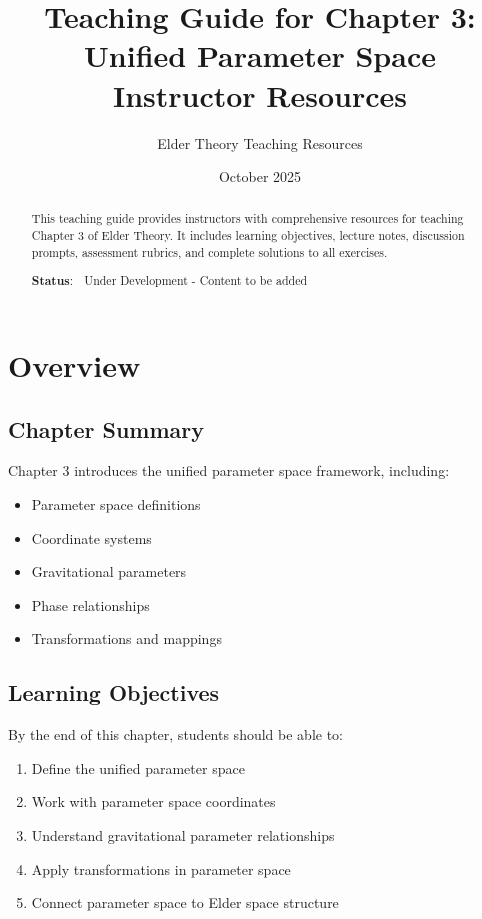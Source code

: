 \documentclass[12pt,a4paper]{article}
\title{\textbf{Teaching Guide for Chapter 3:}\\
\Large{Unified Parameter Space}\\
\large{Instructor Resources}}
\author{Elder Theory Teaching Resources}
\date{October 2025}
\begin{document}
\maketitle

\begin{abstract}
This teaching guide provides instructors with comprehensive resources for teaching Chapter 3 of Elder Theory. It includes learning objectives, lecture notes, discussion prompts, assessment rubrics, and complete solutions to all exercises.

\textbf{Status}: 🚧 Under Development - Content to be added
\end{abstract}

\tableofcontents
\newpage

\section{Overview}

\subsection{Chapter Summary}
Chapter 3 introduces the unified parameter space framework, including:
\begin{itemize}
    \item Parameter space definitions
    \item Coordinate systems
    \item Gravitational parameters
    \item Phase relationships
    \item Transformations and mappings
\end{itemize}

\subsection{Learning Objectives}

By the end of this chapter, students should be able to:
\begin{enumerate}
    \item Define the unified parameter space
    \item Work with parameter space coordinates
    \item Understand gravitational parameter relationships
    \item Apply transformations in parameter space
    \item Connect parameter space to Elder space structure
\end{enumerate}
\end{document}
